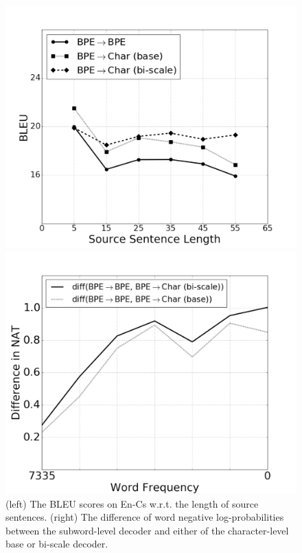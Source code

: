 \documentclass[11pt]{article}
\begin{document}
\begin{figure}[t]
    \begin{minipage}{0.49\columnwidth}
        \centering
        \includegraphics[width=1.\columnwidth]{en_cs.pdf}
    \end{minipage}
    \hfill
    \begin{minipage}{0.49\columnwidth}
        \centering
        \includegraphics[width=1.\columnwidth]{diff_log_prob.pdf}
    \end{minipage}

    \caption{(left) The BLEU scores on En-Cs w.r.t. the length of source sentences. 
        (right) The difference of word negative log-probabilities
        between the subword-level decoder and either of the character-level base
        or bi-scale decoder. 
    }
    \label{fig:qual1}

\end{figure}
\end{document}
